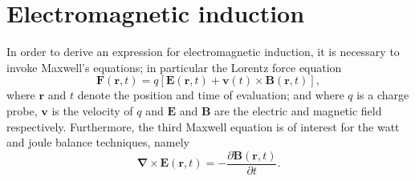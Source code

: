 \documentclass{report}
\numberwithin{tm}{section}
\newcommand\vect[1]{\ensuremath{\bm{#1}}}
\begin{document}
	\section{Electromagnetic induction}
 In order to derive an expression for electromagnetic induction, it is necessary to invoke Maxwell's equations; in particular the Lorentz force equation \begin{equation}
		\vect{F}(\vect{r}, t) = q\left[\vect{E}(\vect{r},t) + \vect{v}(t)\times \vect{B}(\vect{r},t)\right],
	\end{equation} where $\vect{r}$ and $t$ denote the position and time of evaluation; and where $q$ is a charge probe, $\vect{v}$ is the velocity of $q$ and $\vect{E}$ and $\vect{B}$ are the electric and magnetic field respectively. Furthermore, the third Maxwell equation is of interest for the watt and joule balance techniques, namely \begin{equation}\label{eq:maxwell3rd_diff}
	\vect{\nabla} \times \vect{E}(\vect{r},t) = -\frac{\partial \vect{B}(\vect{r},t)}{\partial t}.
	\end{equation}
	
\end{document}
